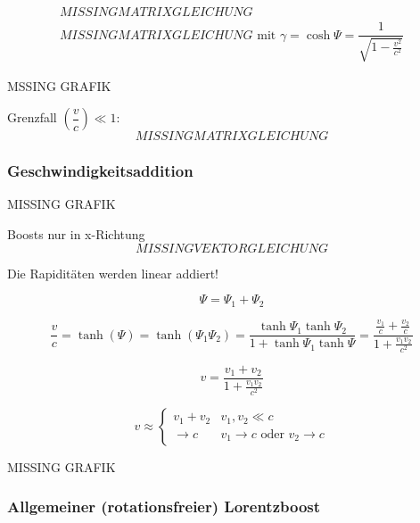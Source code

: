 \documentclass[a4paper, 11pt]{article}
\numberwithin{equation}{section}
\begin{document}
\begin{equation}
\begin{aligned}
MISSING MATRIXGLEICHUNG\\
\boxed{
MISSING MATRIXGLEICHUNG \text{  mit  } \gamma = \cosh \Psi = \dfrac{1}{\sqrt{1- \frac{v^2}{c^2}}}
}
\end{aligned}
\end{equation}

MSSING GRAFIK


Grenzfall $\left( \dfrac{v}{c} \right) \ll 1$:
\begin{equation*}
MISSING MATRIXGLEICHUNG
\end{equation*}


\subsubsection*{Geschwindigkeitsaddition}

MISSING GRAFIK

Boosts nur in x-Richtung
\begin{equation}
MISSING VEKTORGLEICHUNG
\end{equation}

Die Rapiditäten werden linear addiert!

\begin{equation}
\boxed{
\Psi = \Psi_1 + \Psi_2}
\end{equation}

\begin{equation*}
\dfrac{v}{c} = \tanh (\Psi) = \tanh(\Psi_1 \Psi_2) = \dfrac{\tanh \Psi_1 \tanh\Psi_2}{1+\tanh\Psi_1\tanh\Psi} = \dfrac{\frac{v_1}{c}+ \frac{v_2}{c}}{1 + \frac{v_1v_2}{c^2}}
\end{equation*}


\begin{equation}
\boxed{
v = \dfrac{v_1+v_2}{1+\frac{v_1v_2}{c^2}}}
\end{equation}

\begin{equation*}
v \approx \begin{cases} v_1 + v_2 &    v_1,v_2 \ll c \\
\rightarrow c   &  v_1 \rightarrow c \text{ oder } v_2 \rightarrow c \end{cases}
\end{equation*}

MISSING GRAFIK


\subsubsection*{Allgemeiner (rotationsfreier) Lorentzboost}
\end{document}
